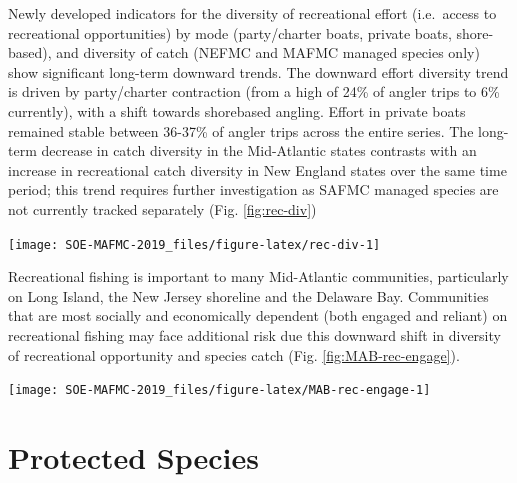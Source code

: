 \documentclass[10pt,]{article}
\let\origfigure\figure
\let\endorigfigure\endfigure
\renewenvironment{figure}[1][2] {
    \expandafter\origfigure\expandafter[H]
} {
    \endorigfigure
}
\begin{document}
Newly developed indicators for the diversity of recreational effort
(i.e.~access to recreational opportunities) by mode (party/charter
boats, private boats, shore-based), and diversity of catch (NEFMC and
MAFMC managed species only) show significant long-term downward trends.
The downward effort diversity trend is driven by party/charter
contraction (from a high of 24\% of angler trips to 6\% currently), with
a shift towards shorebased angling. Effort in private boats remained
stable between 36-37\% of angler trips across the entire series. The
long-term decrease in catch diversity in the Mid-Atlantic states
contrasts with an increase in recreational catch diversity in New
England states over the same time period; this trend requires further
investigation as SAFMC managed species are not currently tracked
separately (Fig. \ref{fig:rec-div})

\begin{figure}

{\centering \texttt{[image: SOE-MAFMC-2019\_files/figure-latex/rec-div-1]} 

}

\caption{Recreational effort diversity and diversity of recreational catch in the Mid-Atlantic.}\label{fig:rec-div}
\end{figure}

Recreational fishing is important to many Mid-Atlantic communities,
particularly on Long Island, the New Jersey shoreline and the Delaware
Bay. Communities that are most socially and economically dependent (both
engaged and reliant) on recreational fishing may face additional risk
due this downward shift in diversity of recreational opportunity and
species catch (Fig. \ref{fig:MAB-rec-engage}).

\begin{figure}

{\centering \texttt{[image: SOE-MAFMC-2019\_files/figure-latex/MAB-rec-engage-1]} 

}

\caption{Recreational engagement (shore, private vessel and for-hire recreational fishing in a community) and reliance (per capita engagement) based on 2016 landings and the ACS running average of 2012-2016 census data.}\label{fig:MAB-rec-engage}
\end{figure}

\newpage

\section{Protected Species}\label{protected-species}
\end{document}
